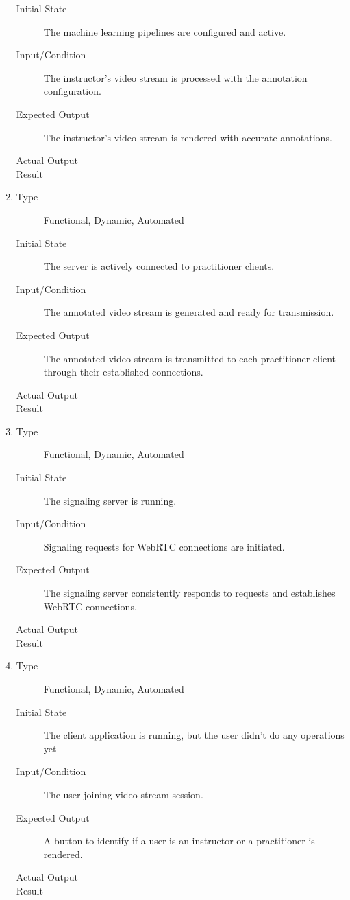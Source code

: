 \documentclass[12pt, titlepage]{article}
\begin{document}
\begin{enumerate}[FR-T1]
\begin{description}
    \item[Initial State] The machine learning pipelines are configured and active.
    \item[Input/Condition] The instructor's video stream is processed with the
      annotation configuration.
    \item[Expected Output] The instructor's video stream is rendered with accurate
      annotations.
    \item[Actual Output] 
    \item[Result] 
    \end{description}
  \item \label{FRT10}
    \begin{description}
    \item[Type] Functional, Dynamic, Automated
    \item[Initial State] The server is actively connected to practitioner clients.
    \item[Input/Condition] The annotated video stream is generated and ready for
      transmission.
    \item[Expected Output] The annotated video stream is transmitted to each
      practitioner-client through their established connections.
    \item[Actual Output] 
    \item[Result] 
    \end{description}
  \item \label{FRT11}
    \begin{description}
    \item[Type] Functional, Dynamic, Automated
    \item[Initial State] The signaling server is running.
    \item[Input/Condition] Signaling requests for WebRTC connections are initiated.
    \item[Expected Output] The signaling server consistently responds to requests and
      establishes WebRTC connections.
    \item[Actual Output] 
    \item[Result] 
    \end{description}
  \item \label{FRT12}
    \begin{description}
    \item[Type] Functional, Dynamic, Automated
    \item[Initial State] The client application is running, but the user didn’t do
      any operations yet
    \item[Input/Condition] The user joining video stream session.
    \item[Expected Output] A button to identify if a user is an instructor or a
      practitioner is rendered.
    \item[Actual Output] 
    \item[Result] 
    \end{description}
  \end{enumerate}
\end{document}
